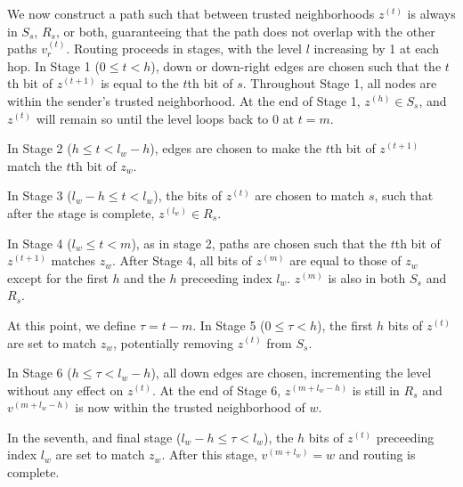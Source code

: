 \documentclass[prodmode,permissions]{acmsmall-ec16}
\begin{document}
We now construct a path such that between trusted neighborhoods $z^{(t)}$ is always
in $S_s$, $R_s$, or both, guaranteeing that the path does not overlap with the
other paths $v_r^{(t)}$.
Routing proceeds in stages, with the level $l$ increasing by 1 at each hop.
In Stage 1 ($0 \leq t < h$), down or down-right edges
are chosen such that the $t$th bit of $z^{(t+1)}$ is equal to the $t$th bit
of $s$. Throughout Stage 1, all nodes are within the sender's trusted neighborhood.
At the end of Stage 1, $z^{(h)} \in S_s$, and $z^{(t)}$ will remain so until the level loops
back to $0$ at $t = m$.

In Stage 2 ($h \leq t < l_w - h$), edges are chosen to make the $t$th bit of
$z^{(t+1)}$ match the $t$th bit of $z_w$.

In Stage 3 ($l_w - h \leq t < l_w$), the bits of $z^{(t)}$ are chosen to match $s$,
such that after the stage is complete, $z^{(l_w)} \in R_s$.

In Stage 4 ($l_w \leq t < m$), as in stage 2,
paths are chosen such that the $t$th bit of $z^{(t+1)}$ matches $z_w$.
After Stage 4, all bits of $z^{(m)}$ are equal to those of $z_w$
except for the first $h$ and the $h$ preceeding index $l_w$.
$z^{(m)}$ is also in both $S_s$ and $R_s$.

At this point, we define $\tau = t - m$.
In Stage 5 ($0 \leq \tau < h$), the first $h$ bits of $z^{(t)}$ are set to
match $z_w$, potentially removing $z^{(t)}$ from $S_s$.

In Stage 6 ($h \leq \tau < l_w - h$), all down edges are chosen, incrementing
the level without any effect on $z^{(t)}$.
At the end of Stage 6, $z^{(m + l_w - h)}$ is still in $R_s$ and
$v^{(m + l_w - h)}$ is now within the trusted neighborhood of $w$.

In the seventh, and final stage ($l_w - h \leq \tau < l_w$), the $h$ bits of $z^{(t)}$
preceeding index $l_w$ are set to match $z_w$.
After this stage, $v^{(m + l_w)} = w$ and routing is complete.
\end{document}
